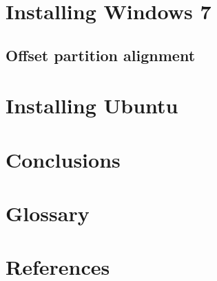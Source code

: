 \documentclass[11pt,letterpaper]{article}
\begin{document}
\section{Installing Windows 7}
	\subsection{Offset partition alignment}

\section{Installing Ubuntu}



\section{Conclusions}

\singlespacing

\section*{Glossary}

\section*{References}
\end{document}
